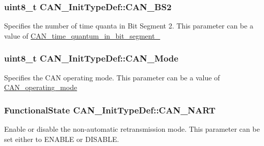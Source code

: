 \subsubsection[{C\+A\+N\+\_\+\+B\+S2}]{\setlength{\rightskip}{0pt plus 5cm}uint8\+\_\+t C\+A\+N\+\_\+\+Init\+Type\+Def\+::\+C\+A\+N\+\_\+\+B\+S2}\label{struct_c_a_n___init_type_def_a693eb00830d6e2aeb4d9fabdba85b9cf}
Specifies the number of time quanta in Bit Segment 2. This parameter can be a value of \hyperlink{group___c_a_n__time__quantum__in__bit__segment__2}{C\+A\+N\+\_\+time\+\_\+quantum\+\_\+in\+\_\+bit\+\_\+segment\+\_} \hypertarget{struct_c_a_n___init_type_def_a24816ff18ae048a5ec4bbb22aa2c04f9}{}
\subsubsection[{C\+A\+N\+\_\+\+Mode}]{\setlength{\rightskip}{0pt plus 5cm}uint8\+\_\+t C\+A\+N\+\_\+\+Init\+Type\+Def\+::\+C\+A\+N\+\_\+\+Mode}\label{struct_c_a_n___init_type_def_a24816ff18ae048a5ec4bbb22aa2c04f9}
Specifies the C\+A\+N operating mode. This parameter can be a value of \hyperlink{group___c_a_n__operating__mode}{C\+A\+N\+\_\+operating\+\_\+mode} \hypertarget{struct_c_a_n___init_type_def_a5adeac1b7b47f2b91e667eddc181ac09}{}
\subsubsection[{C\+A\+N\+\_\+\+N\+A\+R\+T}]{\setlength{\rightskip}{0pt plus 5cm}Functional\+State C\+A\+N\+\_\+\+Init\+Type\+Def\+::\+C\+A\+N\+\_\+\+N\+A\+R\+T}\label{struct_c_a_n___init_type_def_a5adeac1b7b47f2b91e667eddc181ac09}
Enable or disable the non-\/automatic retransmission mode. This parameter can be set either to E\+N\+A\+B\+L\+E or D\+I\+S\+A\+B\+L\+E. \hypertarget{struct_c_a_n___init_type_def_a3e91dbcbf30b893a9bd6a65606cb8fe9}{}
